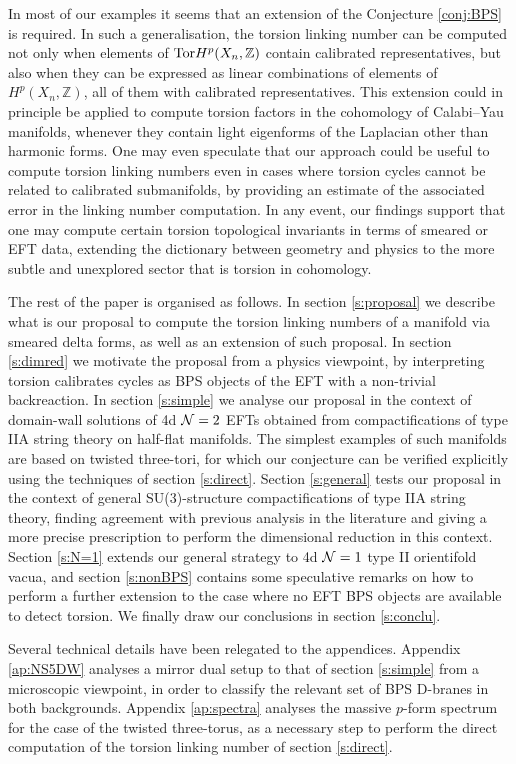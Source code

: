 \documentclass[11pt]{article}
\def\CN {{\cal N}}
\newcommand{\IZ}{\mathbb{Z}}
\begin{document}
In most of our examples it seems that an extension of the Conjecture \ref{conj:BPS} is required. In such a generalisation, the torsion linking number can be computed not only when elements of ${\rm Tor}H^p(X_n, \IZ)$ contain calibrated representatives, but also when they can be expressed as linear combinations of elements of $H^p(X_n, \IZ)$, all of them with calibrated representatives. This extension could in principle be applied to compute torsion factors in the cohomology of Calabi--Yau manifolds, whenever they contain light eigenforms of the Laplacian other than harmonic forms. One may even speculate that our approach could be useful to compute torsion linking numbers even in cases where torsion cycles cannot be related to calibrated submanifolds, by providing an estimate of the associated error in the linking number computation. In any event, our findings support that one may compute certain torsion topological invariants in terms of smeared or EFT data, extending the dictionary between geometry and physics to the more subtle and unexplored sector that is torsion in cohomology. 

The rest of the paper is organised as follows. In section \ref{s:proposal} we describe what is our proposal to compute the torsion linking numbers of a manifold via smeared delta forms, as well as an extension of such proposal. In section \ref{s:dimred} we motivate the proposal from a physics viewpoint, by interpreting torsion calibrates cycles as BPS objects of the EFT with a non-trivial backreaction. In section \ref{s:simple} we analyse our proposal in the context of domain-wall solutions of 4d $\CN=2$ EFTs obtained from compactifications of type IIA string theory on half-flat manifolds. The simplest examples of such manifolds are based on twisted three-tori, for which our conjecture can be verified explicitly using the techniques of section \ref{s:direct}. Section \ref{s:general} tests our proposal in the context of general SU(3)-structure compactifications of type IIA string theory, finding agreement with previous analysis in the literature and giving a more precise prescription to perform the dimensional reduction in this context. Section \ref{s:N=1} extends our general strategy to 4d $\CN=1$  type II orientifold vacua, and section \ref{s:nonBPS} contains some speculative remarks on how to perform a further extension to the case where no EFT BPS objects are available to detect torsion. We finally draw our conclusions in section \ref{s:conclu}. 

Several technical details have been relegated to the appendices. Appendix \ref{ap:NS5DW} analyses a mirror dual setup to that of section \ref{s:simple} from a microscopic viewpoint, in order to classify the relevant set of BPS D-branes in both backgrounds. Appendix \ref{ap:spectra} analyses the massive $p$-form spectrum for the case of the twisted three-torus, as a necessary step to perform the direct computation of the torsion linking number of section \ref{s:direct}.
\end{document}
